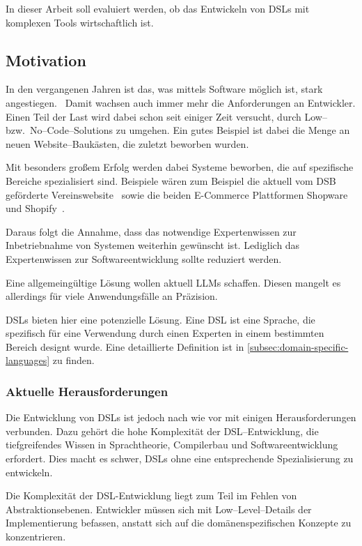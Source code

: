 In dieser Arbeit soll evaluiert werden, ob das Entwickeln von \acp{DSL} mit komplexen Tools wirtschaftlich ist.

\subsection{Motivation}\label{subsec:motivation}
In den vergangenen Jahren ist das, was mittels Software möglich ist, stark angestiegen.~\autocite{forrester-2024}
Damit wachsen auch immer mehr die Anforderungen an Entwickler.
Einen Teil der Last wird dabei schon seit einiger Zeit versucht, durch Low-- bzw.\ No--Code--Solutions zu umgehen.
Ein gutes Beispiel ist dabei die Menge an neuen Website--Baukästen, die zuletzt beworben wurden. \autocite{p-2024}

Mit besonders großem Erfolg werden dabei Systeme beworben, die auf spezifische Bereiche spezialisiert sind.
Beispiele wären zum Beispiel die aktuell vom DSB geförderte Vereinswebsite~\autocite{deutscher-olympischer-sportbund-ev-no-date} sowie die beiden E-Commerce Plattformen Shopware~\autocite{shopware-ag-no-date} und Shopify~\autocite{shopify-international-ltd-no-date}.

Daraus folgt die Annahme, dass das notwendige Expertenwissen zur Inbetriebnahme von Systemen weiterhin gewünscht ist.
Lediglich das Expertenwissen zur Softwareentwicklung sollte reduziert werden.

Eine allgemeingültige Lösung wollen aktuell \acp{LLM} schaffen.
Diesen mangelt es allerdings für viele Anwendungsfälle an Präzision.

\acp{DSL} bieten hier eine potenzielle Lösung.
Eine \ac{DSL} ist eine Sprache, die spezifisch für eine Verwendung durch einen Experten in einem bestimmten Bereich designt wurde.
Eine detaillierte Definition ist in \autoref{subsec:domain-specific-languages} zu finden.

\subsubsection{Aktuelle Herausforderungen}
Die Entwicklung von \acp{DSL} ist jedoch nach wie vor mit einigen Herausforderungen verbunden.
Dazu gehört die hohe Komplexität der \acs{DSL}--Entwicklung, die tiefgreifendes Wissen in Sprachtheorie, Compilerbau und Softwareentwicklung erfordert.
Dies macht es schwer, \acp{DSL} ohne eine entsprechende Spezialisierung zu entwickeln.

Die Komplexität der DSL-Entwicklung liegt zum Teil im Fehlen von Abstraktionsebenen.
Entwickler müssen sich mit Low--Level--Details der Implementierung befassen, anstatt sich auf die domänenspezifischen Konzepte zu konzentrieren.

